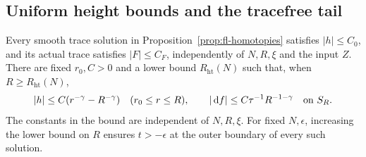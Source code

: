 \subsection{Uniform height bounds and the tracefree tail}
\label{subsec:fl-height}

\begin{lemma}
\label{lem:fl-height}
Every smooth trace solution in Proposition~\ref{prop:fl-homotopies}
satisfies \(\lvert h\rvert\le C_0\), and its actual trace satisfies
\(\lvert F\rvert\le C_F\), independently of \(N,R,\xi\) and the input
\(Z\).  There are fixed \(r_0,C>0\) and a lower bound
\(R_{\mathrm{ht}}(N)\) such that, when
\(R\ge R_{\mathrm{ht}}(N)\),
\begin{equation}
\label{eq:fl-end-height}
 \lvert h\rvert\le C(r^{-\gamma}-R^{-\gamma})
       \quad(r_0\le r\le R),\qquad
 \lvert\,\mathrm d f\rvert\le C\tau^{-1}R^{-1-\gamma}\quad\hbox{on }S_R .
\end{equation}
The constants in the bound are independent of \(N,R,\xi\).
For fixed \(N,\epsilon\), increasing the lower bound on \(R\)
ensures \(t>-\epsilon\) at the outer boundary of every such solution.
\end{lemma}

